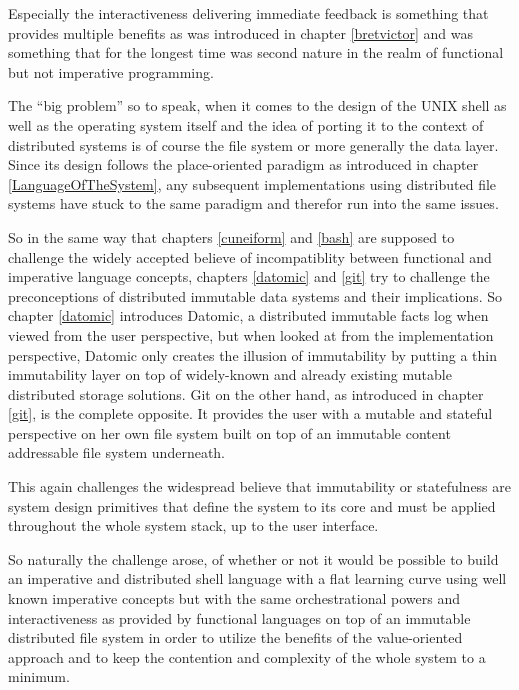 Especially the interactiveness delivering immediate feedback is
something that provides multiple benefits as was introduced in chapter
\ref{bretvictor} and was something that for the longest time was second
nature in the realm of functional but not imperative programming.

The ``big problem'' so to speak, when it comes to the design of the
UNIX shell as well as the operating system itself and the idea of
porting it to the context of distributed systems is of course the
file system or more generally the data layer. Since its design
follows the place-oriented paradigm as introduced in chapter
\ref{LanguageOfTheSystem}, any subsequent implementations
using distributed file systems have stuck to the same paradigm
and therefor run into the same issues.

So in the same way that chapters \ref{cuneiform} and \ref{bash}
are supposed to challenge the widely accepted believe of
incompatiblity between functional and imperative language concepts,
chapters \ref{datomic} and \ref{git} try to challenge the
preconceptions of distributed immutable data systems and their
implications. So chapter \ref{datomic} introduces Datomic,
a distributed immutable facts log when viewed from the user
perspective, but when looked at from the implementation perspective,
Datomic only creates the illusion of immutability by putting a thin
immutability layer on top of widely-known and already existing
mutable distributed storage solutions. Git on the other hand,
as introduced in chapter \ref{git}, is the complete opposite. It
provides the user with a mutable and stateful perspective on her
own file system built on top of an immutable content addressable
file system underneath.

This again challenges the widespread believe that immutability
or statefulness are system design primitives that define the
system to its core and must be applied throughout the whole system
stack, up to the user interface.
\newline

So naturally the challenge arose, of whether or not it would be
possible to build an imperative and distributed
shell language with a flat learning curve using well known
imperative concepts  but with the same orchestrational powers and
interactiveness as provided by functional languages on top of
an immutable distributed file system in order to utilize the
benefits of the value-oriented approach and to keep the contention
and complexity of the whole system to a minimum.
\newline

